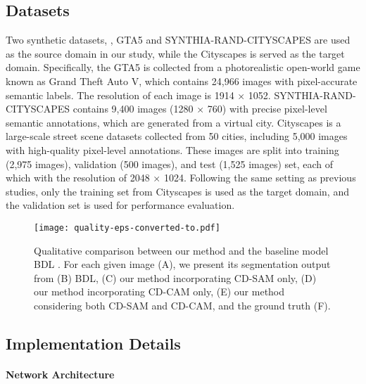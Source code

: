 \documentclass[10pt,twocolumn,letterpaper]{article}
\begin{document}
	\subsection{Datasets}

	Two synthetic datasets, \ie, GTA5 \cite{richter2016playing} and SYNTHIA-RAND-CITYSCAPES \cite{ros2016synthia} are used as the source domain in our study, while the Cityscapes \cite{cordts2016cityscapes} is served as the target domain. Specifically, the GTA5 is collected from a photorealistic open-world game known as Grand Theft Auto V, which contains 24,966 images with pixel-accurate semantic labels. The resolution of each image is 1914 $ \times $ 1052. SYNTHIA-RAND-CITYSCAPES contains 9,400 images (1280 $ \times $ 760) with precise pixel-level semantic annotations, which are generated from a virtual city. Cityscapes is a large-scale street scene datasets collected from 50 cities, including 5,000 images with high-quality pixel-level annotations. These images are split into training (2,975 images), validation (500 images), and test (1,525 images) set, each of which with the resolution of 2048 $ \times $ 1024. Following the same setting as previous studies, only the training set from Cityscapes is used as the target domain, and the validation set is used for performance evaluation.

	\begin{figure*}
		\begin{center}
\texttt{[image: quality-eps-converted-to.pdf]}
		\end{center}
		\caption{Qualitative comparison between our method and the baseline model BDL \cite{li2019bidirectional}. For each given image (A), we present its segmentation output from (B) BDL, (C) our method incorporating CD-SAM only, (D) our method incorporating CD-CAM only, (E) our method considering both CD-SAM and CD-CAM, and the ground truth (F).}
		\label{fig:quality}
		\vspace{-0.2in}
	\end{figure*}

	\subsection{Implementation Details}
	\paragraph{Network Architecture}
\end{document}

